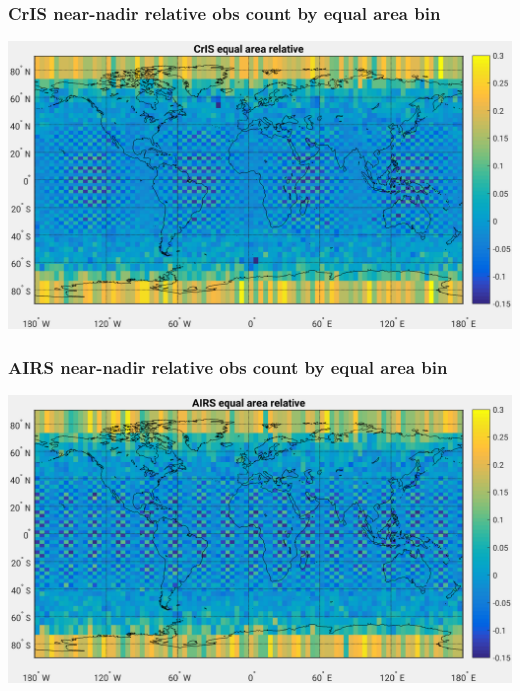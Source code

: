\documentclass[11pt]{beamer}
\begin{document}
\begin{frame}
\frametitle{CrIS near-nadir relative obs count by equal area bin}
\begin{center}
  \includegraphics[scale=0.5]{figures/cris_eq_area_rel_obs_d1s1w1.pdf}
\end{center}
\end{frame} %
\begin{frame}
\frametitle{AIRS near-nadir relative obs count by equal area bin}
\begin{center}
  \includegraphics[scale=0.5]{figures/airs_eq_area_rel_obs_d1s1w1.pdf}
\end{center}
\end{frame} %
\end{document}
